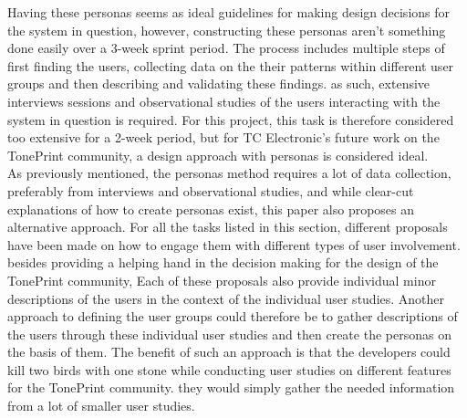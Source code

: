 \noindent
Having these personas seems as ideal guidelines for making design decisions for the system in question, however, constructing these personas aren't something done easily over a 3-week sprint period. The process includes multiple steps of first finding the users, collecting data on the their patterns within different user groups and then describing and validating these findings. as such, extensive interviews sessions and observational studies of the users interacting with the system in question is required. For this project, this task is therefore considered too extensive for a 2-week period, but for TC Electronic's future work on the TonePrint community, a design approach with personas is considered ideal.\\

\noindent
As previously mentioned, the personas method requires a lot of data collection, preferably from interviews and observational studies, and while clear-cut explanations of how to create personas exist, this paper also proposes an alternative approach. For all the tasks listed in this section, different proposals have been made on how to engage them with different types of user involvement. besides providing a helping hand in the decision making for the design of the TonePrint community, Each of these proposals also provide individual minor descriptions of the users in the context of the individual user studies. Another approach to defining the user groups could therefore be to gather descriptions of the users through these individual user studies and then create the personas on the basis of them. The benefit of such an approach is that the developers could kill two birds with one stone while conducting user studies on different features for the TonePrint community. they would simply gather the needed information from a lot of smaller user studies.

